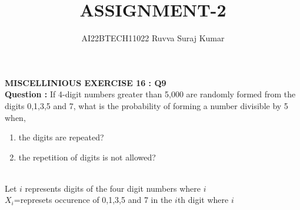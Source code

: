 \documentclass[journal,12pt,twocolumn]{IEEEtran}
\begin{document}
       
\title{ASSIGNMENT-2} 
\author{AI22BTECH11022 Ruvva Suraj Kumar}      


\maketitle

\newpage

\bigskip


\textbf{MISCELLINIOUS EXERCISE 16 : Q9}\\

\textbf{Question :} If 4-digit numbers greater than 5,000 are randomly formed from the digits 0,1,3,5 and 7, what is the probability of forming a number divisible by 5 when,


\begin{enumerate}[label=(\roman*)]
\item the digits are repeated?
\item the repetition of digits is not allowed?
\end{enumerate}


\solution \\
Let $i$ represents digits of the four digit numbers where $i$ \in {}\\
$X_{i}$=represets occurence of 0,1,3,5 and 7 in the $i$th digit where $i$ \in {} \\


\begin{table}[ht!]
    \centering
    
    \caption{}
\end{table}
\end{document}
